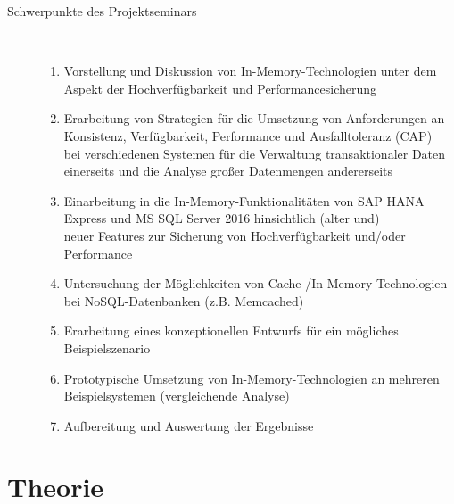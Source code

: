 \documentclass[a4paper, 12pt]{scrartcl}
\begin{document}
\begin{description}
   \item[Schwerpunkte des Projektseminars]~\par
   \begin{enumerate}
      \item Vorstellung und Diskussion von In-Memory-Technologien unter dem Aspekt der Hochverfügbarkeit und Performancesicherung
      \item Erarbeitung von Strategien für die Umsetzung von Anforderungen an Konsistenz, Verfügbarkeit, Performance und Ausfalltoleranz (CAP)\\ bei verschiedenen Systemen für die Verwaltung transaktionaler Daten einerseits und die Analyse großer Datenmengen andererseits
      \item Einarbeitung in die In-Memory-Funktionalitäten von SAP HANA Express und MS SQL Server 2016 hinsichtlich (alter und)\\ neuer Features zur Sicherung von Hochverfügbarkeit und/oder Performance
      \item Untersuchung der Möglichkeiten von Cache-/In-Memory-Technologien\\ bei NoSQL-Datenbanken (z.B. Memcached)
      \item Erarbeitung eines konzeptionellen Entwurfs für ein mögliches Beispielszenario
      \item Prototypische Umsetzung von In-Memory-Technologien an mehreren Beispielsystemen (vergleichende Analyse)
      \item Aufbereitung und Auswertung der Ergebnisse
   \end{enumerate}
   
\end{description}
\newpage
\section{Theorie}
\end{document}
